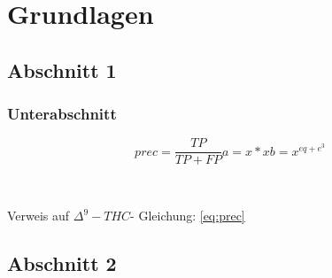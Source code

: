 \chapter{Grundlagen}
\label{ch:theorie}

\section{Abschnitt 1}
\label{sec:IR}


\subsection{Unterabschnitt}
\label{sec:PuR}
\begin{equation}
\label{eq:prec}
prec = \frac{TP}{TP + FP}
a = x*x 
b = x^{eq+e^3}
\end{equation}

 \\ \par
Verweis auf $\Delta^9-THC$- Gleichung: \ref{eq:prec} \par
{}


\section{Abschnitt 2}





	



